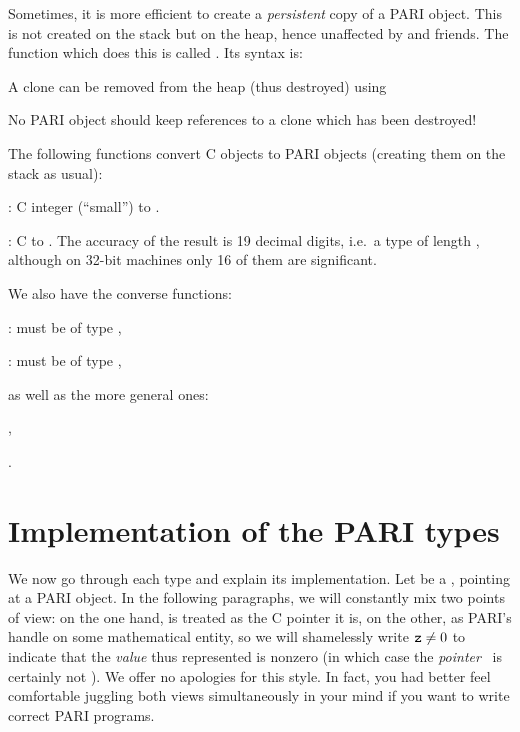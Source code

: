 \label{se:clone}
Sometimes, it is more efficient to create a \emph{persistent} copy of a PARI
object. This is not created on the stack but on the heap, hence unaffected by
 and friends. The function which does this is called
. Its syntax is:


A clone can be removed from the heap (thus destroyed) using


\noindent No PARI object should keep references to a clone which has been
destroyed!

The following functions convert C objects to PARI objects (creating them on
the stack as usual):

: C  integer  (``small'') to .

: C  to . The accuracy of
the result is 19 decimal digits, i.e.~a type  of length
, although on 32-bit machines only 16 of them are
significant.

\noindent We also have the converse functions:

:  must be of type ,

:  must be of type ,

\noindent as well as the more general ones:

,

.

\section{Implementation of the PARI types}
\label{se:impl}

\noindent
We now go through each type and explain its implementation. Let  be a
, pointing at a PARI object. In the following paragraphs, we will
constantly mix two points of view: on the one hand,  is treated as the
C pointer it is, on the other, as PARI's handle on some mathematical entity,
so we will shamelessly write ${\tt z} \ne 0$ to indicate that the
\emph{value} thus represented is nonzero (in which case the
\emph{pointer}~ is certainly not ). We offer no apologies
for this style. In fact, you had better feel comfortable juggling both views
simultaneously in your mind if you want to write correct PARI programs.

